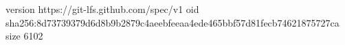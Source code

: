 version https://git-lfs.github.com/spec/v1
oid sha256:8d73739379d6d8b9b2879c4aeebfeeaa4ede465bbf57d81fecb74621875727ca
size 6102
